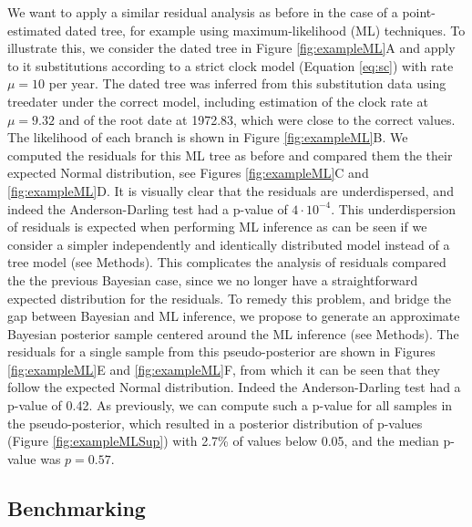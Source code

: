 \documentclass{article}
\begin{document}
We want to apply a similar residual analysis as before in the case of a point-estimated dated tree,
for example using maximum-likelihood (ML) techniques. To illustrate this, we consider the dated
tree in Figure \ref{fig:exampleML}A and apply to it substitutions according to a strict clock model
(Equation \ref{eq:sc}) with rate $\mu=10$ per year. The dated tree was inferred from this substitution data
using treedater \citep{Volz2017} under the correct model, including estimation of the clock rate at 
$\mu=9.32$ and of the root date at 1972.83, which were close to the correct values.
The likelihood of each branch is shown in Figure \ref{fig:exampleML}B.
We computed the residuals for this ML tree as before and compared them the their expected
Normal distribution, see Figures \ref{fig:exampleML}C and \ref{fig:exampleML}D.
It is visually clear that the residuals are underdispersed, and indeed the Anderson-Darling test 
had a p-value of $4\cdot10^{-4}$. This underdispersion of residuals is expected when performing 
ML inference as can be seen if we consider a simpler independently and identically 
distributed model instead of a tree model (see Methods). This complicates the analysis of residuals
compared the the previous Bayesian case, since we no longer have a straightforward expected 
distribution for the residuals. 
%
To remedy this problem, and bridge the gap between Bayesian and 
ML inference, we propose to generate an approximate Bayesian posterior sample centered
around the ML inference (see Methods). The residuals for a single sample from this pseudo-posterior
are shown in Figures \ref{fig:exampleML}E and \ref{fig:exampleML}F, from which it can be seen
that they follow the expected Normal distribution. Indeed the Anderson-Darling test had a p-value
of 0.42. As previously, we can compute such a p-value for all samples in the pseudo-posterior,
which resulted in a posterior distribution of p-values (Figure \ref{fig:exampleMLSup}) with 2.7\% of 
values below 0.05, and the median p-value was $p=0.57$.

\subsection*{Benchmarking}


\end{document}

